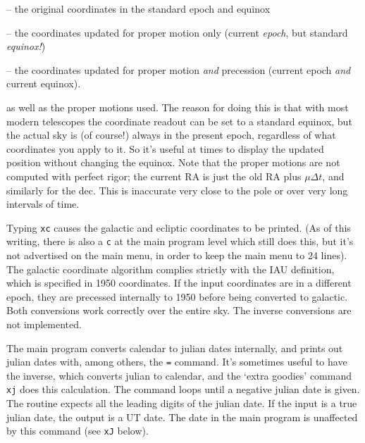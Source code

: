 \item{--} the original coordinates in the standard epoch and equinox

\item{--} the coordinates updated for proper motion only (current
{\it epoch}, but standard {\it equinox!\/})

\item{--} the coordinates updated for proper motion {\it and} precession
(current epoch {\it and} current equinox).

as well as the proper motions used.  The reason for doing this is that
with most modern telescopes the coordinate readout can be set to a 
standard equinox, but the actual sky is (of course!) always in the present 
epoch, regardless of what coordinates you apply to it.  So it's
useful at times to display the updated position
without changing the equinox.  Note that the proper motions
are not computed with perfect rigor; the current RA is just the
old RA plus $\mu \Delta t$, and similarly for the dec.  This is
inaccurate very close
to the pole or over very long intervals of time.
\par
{}
\par
Typing {\tt xc} causes the galactic and ecliptic coordinates to be printed.
(As of this writing, there is also a {\tt c} at the main program level
which still does this, but it's not advertised on the main menu,
in order to keep the main menu to 24 lines).
The galactic coordinate algorithm complies strictly with the IAU definition,
which is specified in 1950 coordinates.
If the input coordinates are in a different epoch,
they are precessed internally
to 1950 before being converted to galactic. 
Both conversions work correctly over the entire sky.  
The inverse conversions are not implemented.
\par
{}
\par
The main program converts calendar to julian dates internally, and 
prints out julian dates with, among others, the {\tt =}
command.  It's sometimes useful to have the inverse,
which converts julian to calendar, 
and the `extra goodies' command {\tt xj} does this calculation.
The command loops until a negative julian date is given.  The routine expects
all the leading digits of the julian date.  If the input is a true
julian date, the output is a UT date.  
The date in the main program is unaffected by this command (see {\tt xJ}
below).
\par
